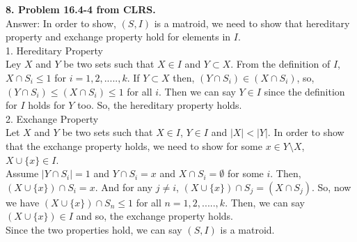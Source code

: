 \documentclass{article}
\begin{document}
\noindent
\textbf{8. Problem 16.4-4 from CLRS.} \\ \newline
Answer: In order to show, $(S,I)$ is a matroid, we need to show that hereditary property and exchange property hold for elements in $I$. \\
1. Hereditary Property \\ 
Ley $X$ and $Y$ be two sets such that $X \in I$ and $Y \subset X$. From the definition of $I$, $X \cap S_i \leq 1$ for $i = 1, 2, ....., k$. If $Y \subset X$ then, $(Y \cap S_i) \in (X \cap S_i)$, so, $(Y \cap S_i) \leq (X \cap S_i) \leq 1$ for all $i$. Then we can say $Y \in I$ since the definition for $I$ holds for $Y$ too. So, the hereditary property holds. \\
2. Exchange Property \\
Let $X$ and $Y$ be two sets such that $X \in I$, $Y \in I$ and $|X| < |Y|$. In order to show that the exchange property holds, we need to show for some $x \in Y \setminus X$, $X \cup \{x\} \in I$.\\
 Assume $|Y \cap S_i| = 1$ and $Y \cap S_i = x$ and $X \cap S_i = \emptyset$ for some $i$. Then, $(X \cup \{x\}) \cap S_i = x$. And for any $j \neq i$, $(X \cup \{x\}) \cap S_j = (X \cap S_j)$. So, now we have $(X \cup \{x\}) \cap S_n \leq 1$ for all $n = 1, 2, ....., k$. Then, we can say  $(X \cup \{x\}) \in I$ and so, the exchange property holds.\\
Since the two properties hold, we can say $(S, I)$ is a matroid.
\noindent
\textbf{}
\end{document}
